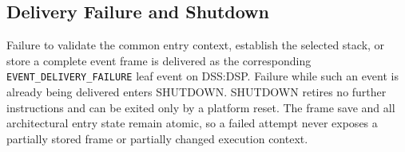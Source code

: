 \subsection{Delivery Failure and Shutdown}
Failure to validate the common entry context, establish the selected stack, or store a complete event frame is
delivered as the corresponding \texttt{EVENT\_DELIVERY\_FAILURE} leaf event on DSS:DSP. Failure while such an event is already being delivered enters SHUTDOWN.
SHUTDOWN retires no further instructions and can be exited only by a platform reset.
The frame save and all architectural entry state remain atomic, so a failed attempt never exposes a partially stored
frame or partially changed execution context.

\Needspace{4.0in}
